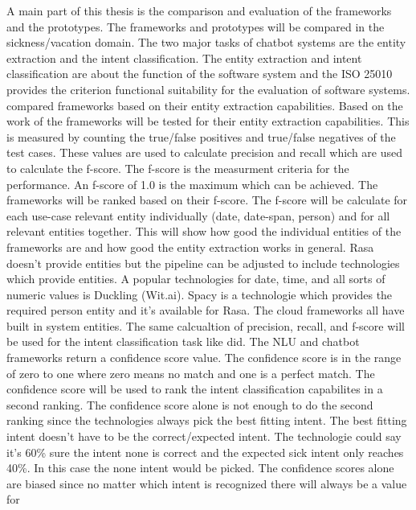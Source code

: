 A main part of this thesis is the comparison and evaluation of the 
frameworks and the prototypes.
The frameworks and prototypes will be compared in the sickness/vacation domain.
The two major tasks of chatbot systems are the entity extraction and the intent 
classification.
The entity extraction and intent classification are about the function of the 
software system and the ISO 25010\cite{iso25010} provides  the criterion functional 
suitability for the evaluation of software systems.
\citet{geyer2016named} compared frameworks based on their entity extraction
capabilities.
Based on the work of \citet{geyer2016named} the frameworks will be tested 
for their entity extraction capabilities.
This is measured by counting the true/false positives and true/false negatives of the test cases.
These  values are used to calculate precision and recall which 
are used to calculate the f-score.
The f-score is the measurment criteria for the performance.
An f-score of 1.0 is the maximum which can be achieved.
The frameworks will be ranked based on their f-score.
The f-score will be calculate for each use-case relevant entity 
individually (date, date-span, person) and for all relevant entities
together.
This will show how good the individual entities of the frameworks are 
and how good the entity extraction works in general.
Rasa doesn't provide entities but the pipeline can be 
adjusted to include technologies which provide entities.
A popular technologies for date, time, and all sorts of 
numeric values is Duckling (Wit.ai).
Spacy is a technologie which provides the required person entity and 
it's available for Rasa.
The cloud frameworks all have built in system entities. 
The same calcualtion of precision, recall, and f-score will be used for the intent 
classification task like \citet{braunEvaluatingNLU} did.
The NLU and chatbot frameworks return a confidence score value.
The confidence score is in the range of zero to one where zero 
means no match and one is a perfect match.
The confidence score will be used to rank the intent classification 
capabilites in a second ranking.
The confidence score alone is not enough to do the second ranking 
since the technologies always pick the best fitting intent.
The best fitting intent doesn't have to be the correct/expected intent.
The technologie could say it's 60\% sure the intent none is correct 
and the expected sick intent only reaches 40\%.
In this case the none intent would be picked.
The confidence scores alone are biased since no matter 
which intent is recognized there will always be a value for 
